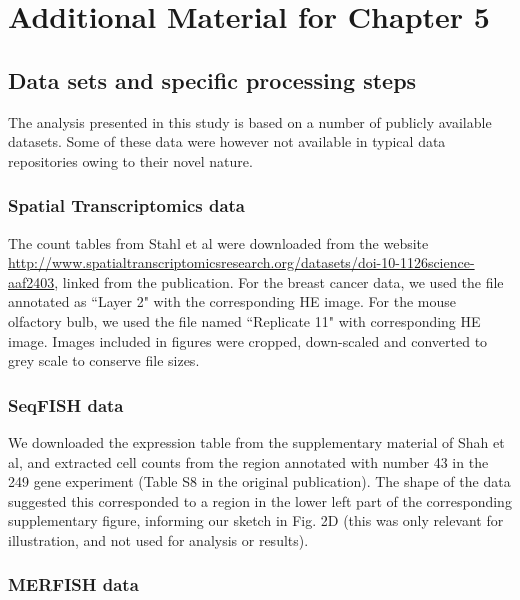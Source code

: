 
\chapter{Additional Material for Chapter 5}

\section{Data sets and specific processing steps}
The analysis presented in this study is based on a number of publicly available datasets. Some of these data were however not available in typical data repositories owing to their novel nature.

\subsection{Spatial Transcriptomics data}

\begin{sloppypar}
The count tables from Stahl et al were downloaded from the website \url{http://www.spatialtranscriptomicsresearch.org/datasets/doi-10-1126science-aaf2403}, linked from the publication. For the breast cancer data, we used the file annotated as ``Layer 2" with the corresponding HE image. For the mouse olfactory bulb, we used the file named ``Replicate 11" with corresponding HE image. Images included in figures were cropped, down-scaled and converted to grey scale to conserve file sizes.
\end{sloppypar}

\subsection{SeqFISH data}

We downloaded the expression table from the supplementary material of Shah et al, and extracted cell counts from the region annotated with number 43 in the 249 gene experiment (Table S8 in the original publication). The shape of the data suggested this corresponded to a region in the lower left part of the corresponding supplementary figure, informing our sketch in Fig. 2D (this was only relevant for illustration, and not used for analysis or results).

\subsection{MERFISH data}

